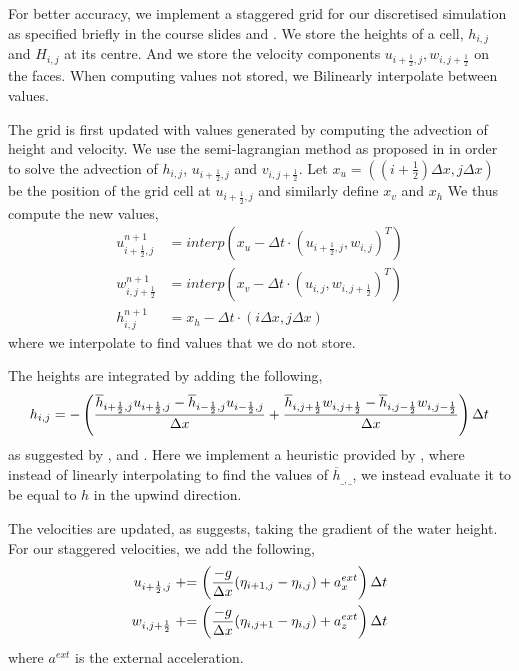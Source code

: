 For better accuracy, we implement a staggered grid for our discretised simulation as specified briefly in the course slides \cite{lec:waves} and \cite{hfluid}.
We store the heights of a cell, $h_{i,j}$ and $H_{i,j}$ at its centre.
And we store the velocity components $u_{i+\frac12, j}, w_{i, j+\frac12}$ on the faces.
When computing values not stored, we Bilinearly interpolate between values.

The grid is first updated with values generated by computing the advection of height and velocity.
We use the semi-lagrangian method as proposed in \cite{lec:waves} in order to solve the advection of $h_{i,j}$, $u_{i+\frac12, j}$ and $v_{i, j+\frac12}$.
Let $x_u = ((i+\frac12) \Delta x, j \Delta x)$ be the position of the grid cell at $u_{i+\frac12, j}$ and similarly define $x_v$ and $x_h$
We thus compute the new values,
\begin{align*}
    u^{n+1}_{i+\frac12, j} &= interp(x_u - \Delta t \cdot (u_{i+\frac12,j}, w_{i,j})^T) \\
    w^{n+1}_{i, j+\frac12} &= interp(x_v - \Delta t \cdot (u_{i,j}, w_{i,j+\frac12})^T) \\
    h^{n+1}_{i,j} &= x_h - \Delta t \cdot (i \Delta x, j \Delta x)
\end{align*}
where we interpolate to find values that we do not store.

The heights are integrated by adding the following,
$$h_{i,j} = - \left( \frac{\overline{h}_{i+\frac12, j} u_{i+\frac12, j} - \overline{h}_{i-\frac12, j} u_{i-\frac12, j}}{\Delta x} +  \frac{\overline{h}_{i, j+\frac12} w_{i, j+\frac12} - \overline{h}_{i, j-\frac12} w_{i, j-\frac12}}{\Delta x}  \right) \Delta t$$
as suggested by \cite{hfluid}, and \cite{lec:waves}.
Here we implement a heuristic provided by \cite{hfluid}, where instead of linearly interpolating to find the values of $\overline h_{\_, \_}$, we instead evaluate it to be equal to $h$ in the upwind direction.

The velocities are updated, as \cite{hfluid} suggests, taking the gradient of the water height.
For our staggered velocities, we add the following,
\begin{align*}
    u_{i+\frac12, j} &\mathrel{+}= \left( \frac{-g}{\Delta x} (\eta_{i+1, j} - \eta_{i,j}) + a^{ext}_x \right) \Delta t \\
    w_{i, j+\frac12} &\mathrel{+}= \left( \frac{-g}{\Delta x} (\eta_{i, j+1} - \eta_{i,j}) + a^{ext}_z \right) \Delta t 
\end{align*}
where $a^{ext}$ is the external acceleration.


